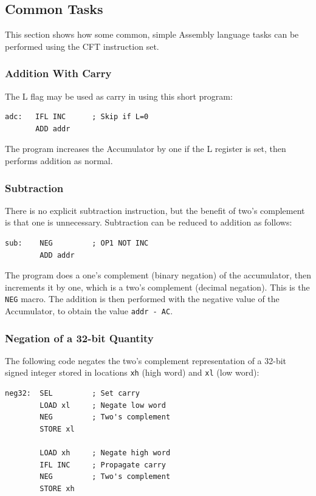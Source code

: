 \documentclass[11pt,a4paper,twocolumns]{article}
\newcommand\register[1]{\textsf{#1}}
\newcommand\Lreg{\register{L}}
\begin{document}
\subsection{Common Tasks}

This section shows how some common, simple Assembly language tasks can
be performed using the CFT instruction set.

\subsubsection{Addition With Carry}

The \Lreg{} flag may be used as carry in using this short program:
\begin{verbatim}
adc:   IFL INC      ; Skip if L=0
       ADD addr
\end{verbatim}

The program increases the Accumulator by one if the \Lreg{} register is set,
then performs addition as normal.

\subsubsection{Subtraction}

There is no explicit subtraction instruction, but the benefit of two's
complement is that one is unnecessary. Subtraction can be reduced to
addition as follows:

\begin{verbatim}
sub:    NEG         ; OP1 NOT INC
        ADD addr
\end{verbatim}

The program does a one's complement (binary negation) of the
accumulator, then increments it by one, which is a two's complement
(decimal negation). This is the {\tt NEG} macro. The addition is then
performed with the negative value of the Accumulator, to obtain the
value {\tt addr - AC}.

\subsubsection{Negation of a 32-bit Quantity}

The following code negates the two's complement representation of a
32-bit signed integer stored in locations {\tt xh} (high word) and
{\tt xl} (low word):

\begin{verbatim}
neg32:  SEL         ; Set carry
        LOAD xl     ; Negate low word
        NEG         ; Two's complement
        STORE xl

        LOAD xh     ; Negate high word
        IFL INC     ; Propagate carry
        NEG         ; Two's complement
        STORE xh
\end{verbatim}
\end{document}
